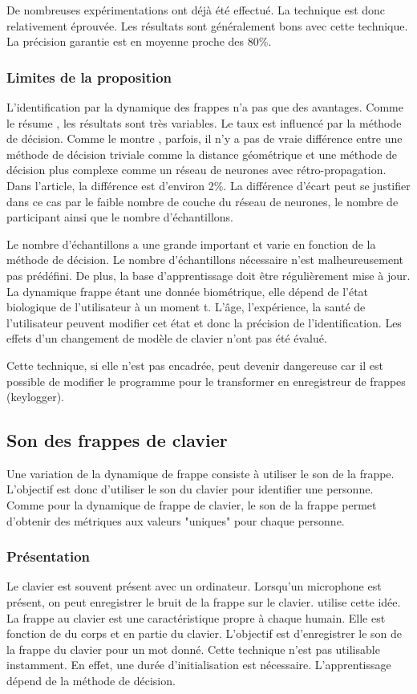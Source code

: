 \documentclass[conference,compsoc]{IEEEtran}
\begin{document}
De nombreuses expérimentations ont déjà été effectué. La technique est donc relativement éprouvée. Les résultats sont généralement bons avec cette technique. La précision garantie est en moyenne proche des 80\%.

\subsubsection{Limites de la proposition}
L'identification par la dynamique des frappes n'a pas que des avantages. Comme le résume \cite{1341408}, les résultats sont très variables. Le taux est influencé par la méthode de décision. Comme le montre \cite{brown1993user}, parfois, il n'y a pas de vraie différence entre une méthode de décision triviale comme la distance géométrique et une méthode de décision plus complexe comme un réseau de neurones avec rétro-propagation. Dans l'article, la différence est d'environ 2\%. La différence d'écart peut se justifier dans ce cas par le faible nombre de couche du réseau de neurones, le nombre de participant ainsi que le nombre d'échantillons.

Le nombre d'échantillons a une grande important et varie en fonction de la méthode de décision. Le nombre d'échantillons nécessaire n'est malheureusement pas prédéfini. De plus, la base d'apprentissage doit être régulièrement mise à jour. La dynamique frappe étant une donnée biométrique, elle dépend de l'état biologique de l'utilisateur à un moment t. L'âge, l'expérience, la santé de l'utilisateur peuvent modifier cet état et donc la précision de l'identification. Les effets d'un changement de modèle de clavier n'ont pas été évalué.

Cette technique, si elle n'est pas encadrée, peut devenir dangereuse car il est possible de modifier le programme pour le transformer en enregistreur de frappes (keylogger).

\subsection{Son des frappes de clavier} %
Une variation de la dynamique de frappe consiste à utiliser le son de la frappe. L'objectif est donc d'utiliser le son du clavier pour identifier une personne. Comme pour la dynamique de frappe de clavier, le son de la frappe permet d'obtenir des métriques aux valeurs "uniques" pour chaque personne.

\subsubsection{Présentation}
Le clavier est souvent présent avec un ordinateur. Lorsqu'un microphone est présent, on peut enregistrer le bruit de la frappe sur le clavier. \cite{7477360} utilise cette idée. La frappe au clavier est une caractéristique propre à chaque humain. Elle est fonction de du corps et en partie du clavier. L'objectif est d'enregistrer le son de la frappe du clavier pour un mot donné.
Cette technique n'est pas utilisable instamment. En effet, une durée d'initialisation est nécessaire. L'apprentissage dépend de la méthode de décision.
\end{document}
